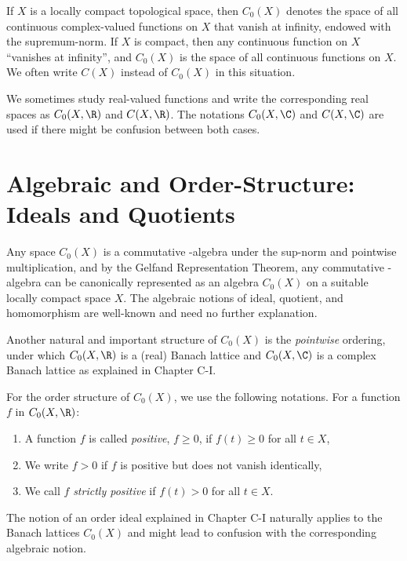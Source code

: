 If $X$ is a locally compact topological space, then $C_{0}(X)$ denotes the space of all continuous complex-valued functions on $X$ that vanish at infinity, endowed with the supremum-norm.
If $X$ is compact, then any continuous function on $X$ \enquote{vanishes at infinity}, and $C_{0}(X)$ is the space of all continuous functions on $X$.
We often write $C(X)$ instead of $C_{0}(X)$ in this situation.

We sometimes study real-valued functions and write the corresponding real spaces as $C_{0}(X,\R)$ and 
$C(X,\R)$. The notations $C_{0}(X,\C)$ and $C(X,\C)$ are used if there might be confusion between both cases.

\section{Algebraic and Order-Structure: Ideals and Quotients}\label{sec:b1-1.1}

Any space $C_{0}(X)$ is a commutative \CA-algebra under the sup-norm and pointwise multiplication, and by the Gelfand Representation Theorem, any commutative \CA-algebra can be canonically represented as an algebra $C_{0}(X)$ on a suitable locally compact space $X$.
The algebraic notions of ideal, quotient, and homomorphism are well-known and need no further explanation.

Another natural and important structure of $C_{0}(X)$ is the \emph{pointwise} ordering, under which $C_{0}(X,\R)$ is a (real) Banach lattice and $C_{0}(X,\C)$ is a complex Banach lattice as explained in Chapter C-I.

For the order structure of $C_{0}(X)$, we use the following notations.
For a function $f$ in $C_{0}(X,\R)$:

\begin{enumerate}[label=]
\item
A function $f$ is called \emph{positive}, $f \geq 0$, if $f(t) \geq 0$ for all $t \in X$, 

\item
We write $f > 0$ if $f$ is positive but does not vanish identically,

\item
We call $f$ \emph{strictly positive} if $f(t) > 0$ for all $t \in X$.
\end{enumerate}

The notion of an order ideal explained in Chapter C-I naturally applies to the Banach lattices $C_{0}(X)$ and might lead to confusion with the corresponding algebraic notion.

